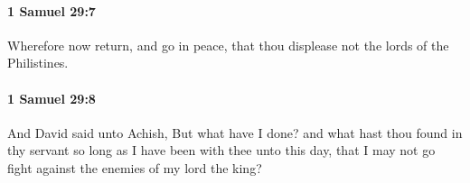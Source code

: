 		\paragraph{1 Samuel 29:7} %
			\label{1SAMUEL-29-7}

			Wherefore now return, and go in peace, that thou displease not the lords of the Philistines.


		\paragraph{1 Samuel 29:8} %
			\label{1SAMUEL-29-8}

			And David said unto Achish, But what have I done? and what hast thou found in thy servant so long as I have been with thee unto this day, that I may not go fight against the enemies of my lord the king?


